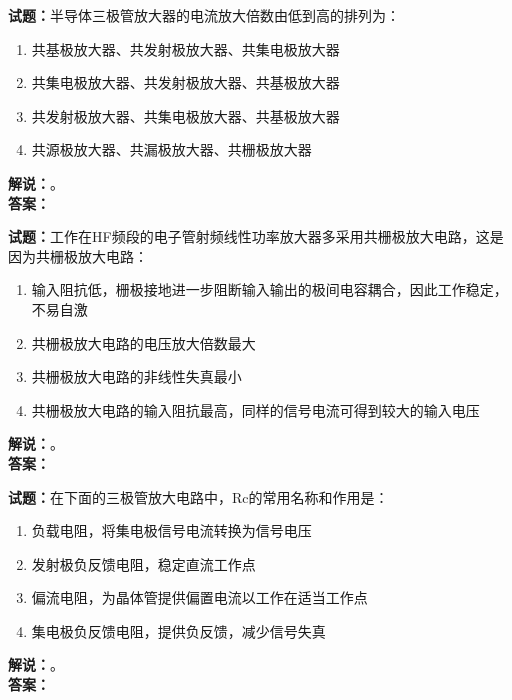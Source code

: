 \documentclass{ctexbook}
\begin{document}
\vspace{\baselineskip}

\noindent\textbf{试题：}半导体三极管放大器的电流放大倍数由低到高的排列为：
\begin{enumerate}[leftmargin=3em]
  \item 共基极放大器、共发射极放大器、共集电极放大器
  \item 共集电极放大器、共发射极放大器、共基极放大器
  \item 共发射极放大器、共集电极放大器、共基极放大器
  \item 共源极放大器、共漏极放大器、共栅极放大器
\end{enumerate}
\noindent\textbf{解说：}\textbf{}。\\\noindent\textbf{答案：}

\vspace{\baselineskip}

\noindent\textbf{试题：}工作在HF频段的电子管射频线性功率放大器多采用共栅极放大电路，这是因为共栅极放大电路：
\begin{enumerate}[leftmargin=3em]
  \item 输入阻抗低，栅极接地进一步阻断输入输出的极间电容耦合，因此工作稳定，不易自激
  \item 共栅极放大电路的电压放大倍数最大
  \item 共栅极放大电路的非线性失真最小
  \item 共栅极放大电路的输入阻抗最高，同样的信号电流可得到较大的输入电压
\end{enumerate}
\noindent\textbf{解说：}\textbf{}。\\\noindent\textbf{答案：}

\vspace{\baselineskip}

\noindent\textbf{试题：}在下面的三极管放大电路中，Rc的常用名称和作用是：
\begin{enumerate}[leftmargin=3em]
  \item 负载电阻，将集电极信号电流转换为信号电压
  \item 发射极负反馈电阻，稳定直流工作点
  \item 偏流电阻，为晶体管提供偏置电流以工作在适当工作点
  \item 集电极负反馈电阻，提供负反馈，减少信号失真
\end{enumerate}
\noindent\textbf{解说：}\textbf{}。\\\noindent\textbf{答案：}

\vspace{\baselineskip}
\end{document}
